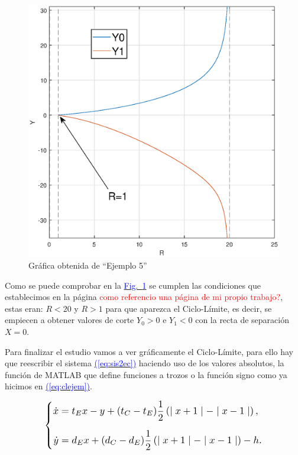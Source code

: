 \documentclass[12pt,a4paper]{report} %
\newcommand{\fref}[1]{\hyperref[#1]{\textcolor{blue}{Fig.~\ref*{#1}}}}
\newcommand{\eref}[1]{\hyperref[#1]{\textcolor{blue}{(\ref*{#1})}}}
\newcommand{\fref}[1]{\hyperref[#1]{\textcolor{blue}{\textit{Fig.~\ref*{#1}}}}}
\newcommand{\eref}[1]{\hyperref[#1]{\textcolor{blue}{\textit{(\ref*{#1})}}}}
\begin{document}
	\begin{figure}[h]
		\centering
		\includegraphics[width=1\textwidth]{ry1ry0.eps}
		\caption{Gráfica obtenida de ``Ejemplo 5''}
		\label{fig:ry1ry0}
	\end{figure}\smallskip
	
	\vspace{0.5cm}\noindent Como se puede comprobar en la \fref{fig:ry1ry0} se cumplen las condiciones que establecimos en la página \textcolor{red}{como referencio una página de mi propio trabajo?}, estas eran: $R<20$ y $R>1$ para que aparezca el Ciclo-Límite, es decir, se empiecen a obtener valores de corte $Y_0>0$ e $Y_1<0$ con la recta de separación $X=0$.
	
	\newpage
	
	Para finalizar el estudio vamos a ver gráficamente el Ciclo-Límite, para ello hay que reescribir el sistema \eref{eq:sis2ec} haciendo uso de los valores absolutos, la función de MATLAB que define funciones a trozos o la función signo como ya hicimos en \eref{eq:clejem}.
	
	\begin{equation}
		\label{eq:clejemsis}
		\scalebox{1.2}{$\displaystyle
			\left\{
			\begin{aligned}
				\dot{x}&=t_Ex-y+(t_C-t_E)\frac{1}{2}\left( \mid x+1 \mid - \mid x-1 \mid \right),
				\\[2mm]
				\dot{y}&=d_Ex+(d_C-d_E)\frac{1}{2}\left( \mid x+1 \mid - \mid x-1 \mid \right)-h.
			\end{aligned}
			\right. 
			$}
	\end{equation}\smallskip
	
\end{document}
